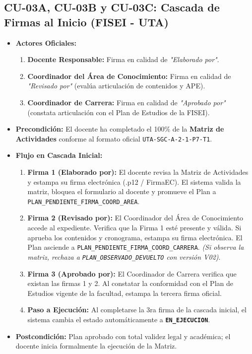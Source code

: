 \documentclass[12pt,a4paper]{article}
\begin{document}
\subsection{CU-03A, CU-03B y CU-03C: Cascada de Firmas al Inicio (FISEI - UTA)}
\begin{itemize}[leftmargin=1.5em, itemsep=2pt]
    \item \textbf{Actores Oficiales:}
    \begin{enumerate}[leftmargin=1.2em, itemsep=1pt]
        \item \textbf{Docente Responsable:} Firma en calidad de \textit{"Elaborado por"}.
        \item \textbf{Coordinador del Área de Conocimiento:} Firma en calidad de \textit{"Revisado por"} (evalúa articulación de contenidos y APE).
        \item \textbf{Coordinador de Carrera:} Firma en calidad de \textit{"Aprobado por"} (constata articulación con el Plan de Estudios de la FISEI).
    \end{enumerate}
    \item \textbf{Precondición:} El docente ha completado el 100\% de la \textbf{Matriz de Actividades} conforme al formato oficial \texttt{UTA-SGC-A-2-1-P7-T1}.
    \item \textbf{Flujo en Cascada Inicial:}
    \begin{enumerate}[leftmargin=1.2em, itemsep=2pt]
        \item \textbf{Firma 1 (Elaborado por):} El docente revisa la Matriz de Actividades y estampa su firma electrónica (.p12 / FirmaEC). El sistema valida la matriz, bloquea el formulario al docente y promueve el Plan a \texttt{PLAN\_PENDIENTE\_FIRMA\_COORD\_AREA}.
        \item \textbf{Firma 2 (Revisado por):} El Coordinador del Área de Conocimiento accede al expediente. Verifica que la Firma 1 esté presente y válida. Si aprueba los contenidos y cronograma, estampa su firma electrónica. El Plan asciende a \texttt{PLAN\_PENDIENTE\_FIRMA\_COORD\_CARRERA}. \textit{(Si observa la matriz, rechaza a \texttt{PLAN\_OBSERVADO\_DEVUELTO} con versión V02)}.
        \item \textbf{Firma 3 (Aprobado por):} El Coordinador de Carrera verifica que existan las firmas 1 y 2. Al constatar la conformidad con el Plan de Estudios vigente de la facultad, estampa la tercera firma oficial.
        \item \textbf{Paso a Ejecución:} Al completarse la 3ra firma de la cascada inicial, el sistema cambia el estado automáticamente a \textbf{\texttt{EN\_EJECUCION}}.
    \end{enumerate}
    \item \textbf{Postcondición:} Plan aprobado con total validez legal y académica; el docente inicia formalmente la ejecución de la Matriz.
\end{itemize}
\end{document}
